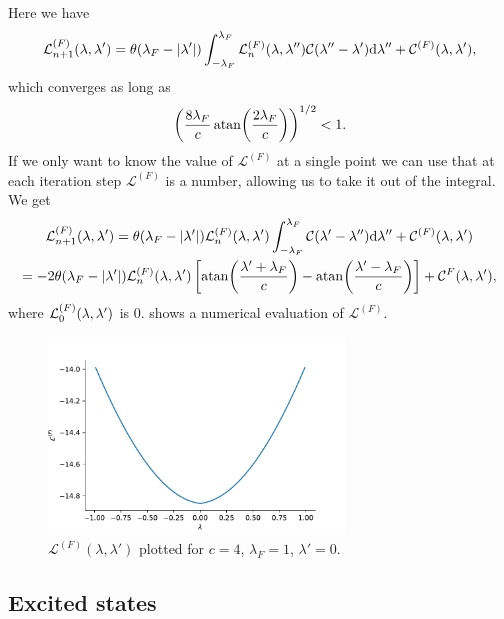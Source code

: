 \documentclass[11pt, a4paper]{report} %
\begin{document}
Here we have 
\begin{equation}
  \mathcal{L}^{(F)}_{n+1} \qty(\lambda, \lambda') = \theta\qty(\lambda_F - \abs{\lambda'}) \int_{-\lambda_F}^{\lambda_F} \mathcal{L}^{(F)}_n\qty(\lambda, \lambda'') \mathcal{C} \qty(\lambda''-\lambda') \dd \lambda'' + \mathcal{C}^{(F)}\qty(\lambda, \lambda'),
\end{equation}
which converges as long as 
\begin{equation}
{\qty(\frac{8\lambda_F}{c} \atan(\frac{2\lambda_F}{c}))}^{1/2} < 1.
\end{equation}
If we only want to know the value of $\mathcal{L}^{(F)}$ at a single point we can use that at each iteration step $\mathcal{L}^{(F)}$ is a number, allowing us to take it out of the integral.
We get
\begin{gather}
  \mathcal{L}^{(F)}_{n+1} \qty(\lambda, \lambda') = \theta\qty(\lambda_F - \abs{\lambda'})  \mathcal{L}^{(F)}_n\qty(\lambda, \lambda') \int_{-\lambda_F}^{\lambda_F} \mathcal{C} \qty(\lambda'-\lambda'') \dd \lambda'' + \mathcal{C}^{(F)}\qty(\lambda, \lambda')\\
= - 2 \theta\qty(\lambda_F - \abs{\lambda'}) \mathcal{L}^{(F)}_n\qty(\lambda, \lambda') \left[ \atan(\frac{\lambda'+\lambda_F}{c}) - \atan(\frac{\lambda'-\lambda_F}{c})\right] + \mathcal{C}^{F}\qty(\lambda,\lambda'),
\end{gather}
where \(\mathcal{L}^{(F)}_0\qty(\lambda, \lambda')\) is 0. 
 shows a numerical evaluation of \(\mathcal{L}^{(F)}\).
\begin{figure}[tb!]
  \centering
  \includegraphics[width=0.7\textwidth]{lfplot.pdf}
  \caption{\(\mathcal{L}^{(F)}(\lambda,\lambda')\) plotted for \(c=4\), \(\lambda_F = 1\), \(\lambda'=0\).}\label{fig:lfplot}
\end{figure}

\subsection{Excited states}
\end{document}
